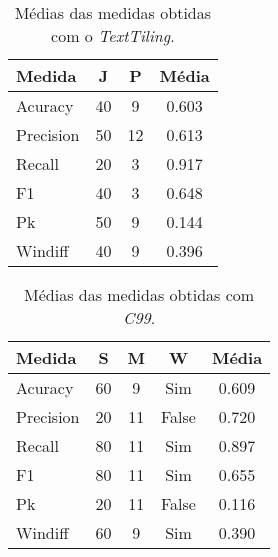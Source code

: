 

\begin{table}[!h]
	\centering
	\begin{tabular}{|l|c|c|c|} \hline
		Medida & \textbf{J} & \textbf{P} & \textbf{Média}\\		\hline

		Acuracy		& 40 & 9  & 0.603 \\ \hline	
		Precision	& 50 & 12 & 0.613 \\ \hline			
		Recall		& 20 & 3  & 0.917 \\ \hline		
		F1			& 40 & 3  & 0.648 \\ \hline	
		Pk			& 50 & 9  & 0.144 \\ \hline	
		Windiff		& 40 & 9  & 0.396 \\ \hline		

	\end{tabular}
	\caption{Médias das medidas obtidas com o \textit{TextTiling}.}
	\label{tab:TextTilingComPreprocess}
\end{table}







\begin{table}[!h]
	\centering

	\begin{tabular}{|l|c|c|c|c|} \hline
		\textbf{Medida} & \textbf{S} & \textbf{M} & \textbf{W} & \textbf{Média}\\	\hline

		Acuracy		& 60 &  9 & Sim 	& 0.609 \\ \hline
		Precision	& 20 & 11 & False 	& 0.720 \\ \hline
		Recall		& 80 & 11 & Sim 	& 0.897 \\ \hline
		F1			& 80 & 11 & Sim 	& 0.655 \\ \hline
		Pk			& 20 & 11 & False 	& 0.116 \\ \hline
		Windiff		& 60 &  9 & Sim 	& 0.390 \\ \hline

	\end{tabular}
	
	\caption{Médias das medidas obtidas com \textit{C99}.}
	\label{tab:C99ComPreprocess}
\end{table}



